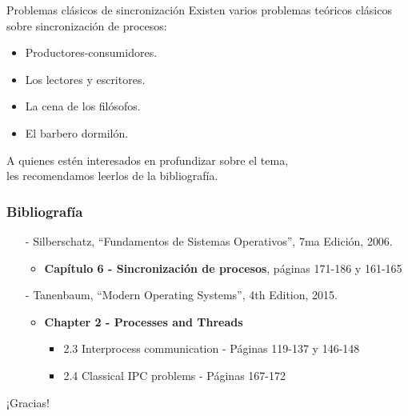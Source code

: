 \documentclass[aspectratio=169]{beamer}
\begin{document}
\begin{frame}{Problemas clásicos de sincronización}
    Existen varios problemas teóricos clásicos sobre sincronización de procesos:\\
    \bigskip
    \begin{itemize} 
        \item Productores-consumidores.
        \item Los lectores y escritores.
        \item La cena de los filósofos.
        \item El barbero dormilón.
    \end{itemize}
    \bigskip
    A quienes estén interesados en profundizar sobre el tema,\\ les recomendamos leerlos de la bibliografía.
\end{frame}

\begin{frame}[fragile]
    \frametitle{Bibliografía}
    \begin{itemize}
        \setlength\itemsep{0.5cm}
        \item[-] \small Silberschatz, ``Fundamentos de Sistemas Operativos'', 7ma Edición, 2006.\\
        \begin{itemize}
            \item \textbf{Capítulo 6 - Sincronización de procesos}, páginas 171-186 y 161-165
        \end{itemize}
        \item[-] \small Tanenbaum, ``Modern Operating Systems'', 4th Edition, 2015.\\
        \begin{itemize}
            \item \textbf{Chapter 2 - Processes and Threads}
            \begin{itemize}
                \item 2.3 Interprocess communication - Páginas 119-137 y 146-148
                \item 2.4 Classical IPC problems - Páginas 167-172
            \end{itemize}
        \end{itemize}
    \end{itemize}
\end{frame}

\begin{frame}[plain]
    \begin{center}
    \vspace{2cm}
    \huge ¡Gracias!\\
    \vspace{2cm}
    \end{center}
\end{frame}
\end{document}
